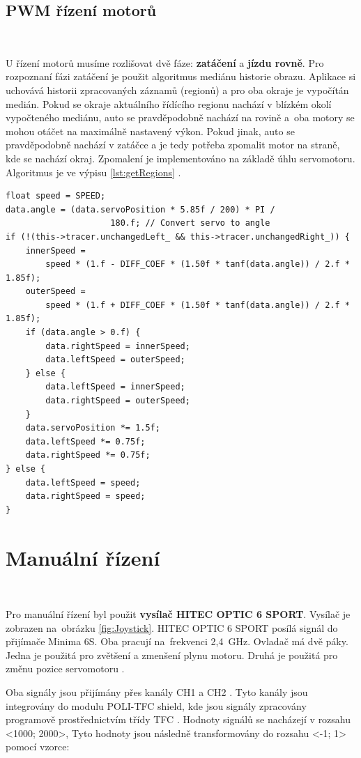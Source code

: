 \subsection{PWM řízení motorů}\

U řízení motorů musíme rozlišovat dvě fáze: \textbf{zatáčení} a \textbf{jízdu
rovně}. Pro rozpoznaní fázi zatáčení je použit algoritmus mediánu historie obrazu.
Aplikace si uchovává historii zpracovaných záznamů (regionů) a pro oba okraje je
vypočítán medián. Pokud se okraje aktuálního řídícího regionu nachází v blízkém
okolí vypočteného mediánu, auto se pravděpodobně nachází na rovině a~oba motory se
mohou otáčet na maximálně nastavený výkon. Pokud jinak, auto se pravděpodobně
nachází v zatáčce a je tedy potřeba zpomalit motor na straně, kde se nachází okraj.
Zpomalení je implementováno na základě úhlu servomotoru. Algoritmus je ve výpisu 
\ref{lst:getRegions} \cite{robot}.

\begin{lstlisting}[caption = Algoritmus kontroly PWM motorů\cite{robot}, label = lst:controlPWM]
float speed = SPEED;
data.angle = (data.servoPosition * 5.85f / 200) * PI /
	                 180.f; // Convert servo to angle
if (!(this->tracer.unchangedLeft_ && this->tracer.unchangedRight_)) {
    innerSpeed =
        speed * (1.f - DIFF_COEF * (1.50f * tanf(data.angle)) / 2.f * 1.85f);
    outerSpeed =
        speed * (1.f + DIFF_COEF * (1.50f * tanf(data.angle)) / 2.f * 1.85f);
    if (data.angle > 0.f) {
        data.rightSpeed = innerSpeed;
        data.leftSpeed = outerSpeed;
    } else {
        data.leftSpeed = innerSpeed;
        data.rightSpeed = outerSpeed;
    }
    data.servoPosition *= 1.5f;
    data.leftSpeed *= 0.75f;
    data.rightSpeed *= 0.75f;
} else {
    data.leftSpeed = speed;
    data.rightSpeed = speed;
}
\end{lstlisting}

\section{Manuální řízení}\

Pro manuální řízení byl použit \textbf{vysílač HITEC OPTIC 6 SPORT}.
Vysílač je zobrazen na~obrázku \ref{fig:Joystick}. HITEC OPTIC 6 SPORT 
posílá signál do přijímače Minima 6S. Oba pracují na~frekvenci 2,4~GHz. 
Ovladač má dvě páky. Jedna je použitá pro zvětšení a zmenšení
plynu motoru. Druhá je použitá pro změnu pozice servomotoru \cite{RC}.

Oba signály jsou přijímány přes kanály CH1 a CH2 \cite{RC}. Tyto kanály jsou
integrovány do modulu POLI-TFC shield, kde jsou signály zpracovány programově
prostřednictvím třídy TFC \cite{draha}. Hodnoty signálů se nacházejí v rozsahu
<1000; 2000>, Tyto hodnoty jsou následně transformovány do rozsahu <-1; 1> pomocí 
vzorce:

